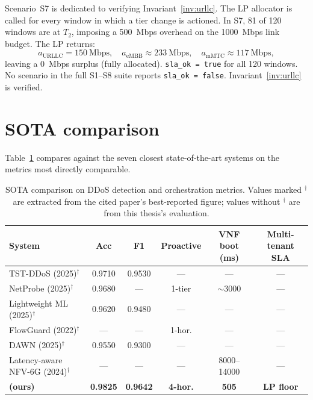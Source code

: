 Scenario~S7 is dedicated to verifying Invariant~\ref{inv:urllc}. The LP
allocator is called for every window in which a tier change is actioned.
In S7, 81 of 120 windows are at $T_2$, imposing a 500~Mbps overhead on
the 1000~Mbps link budget. The LP returns:
\[
  a_{\text{URLLC}} = 150~\text{Mbps},\quad
  a_{\text{eMBB}} \approx 233~\text{Mbps},\quad
  a_{\text{mMTC}} \approx 117~\text{Mbps},
\]
leaving a 0~Mbps surplus (fully allocated). \texttt{sla\_ok = true}
for all 120 windows. No scenario in the full S1--S8 suite reports
\texttt{sla\_ok = false}. Invariant~\ref{inv:urllc} is verified.

\section{SOTA comparison}
\label{sec:sota}

Table~\ref{tab:sota} compares \padonap{} against the seven closest
state-of-the-art systems on the metrics most directly comparable.

\begin{table}[H]
\centering
\footnotesize
\caption{SOTA comparison on DDoS detection and orchestration metrics.
Values marked $^\dagger$ are extracted from the cited paper's best-reported
figure; values without $^\dagger$ are from this thesis's evaluation.}
\label{tab:sota}
\begin{tabular}{@{}lccccc@{}}
\toprule
System & Acc & F1 & Proactive & VNF boot (ms) & Multi-tenant SLA \\
\midrule
TST-DDoS (2025)$^\dagger$            & 0.9710 & 0.9530 & ---    & ---    & --- \\
NetProbe (2025)$^\dagger$            & 0.9680 & ---    & 1-tier & $\sim$3000 & --- \\
Lightweight ML (2025)$^\dagger$      & 0.9620 & 0.9480 & ---    & ---    & --- \\
FlowGuard (2022)$^\dagger$           & ---    & ---    & 1-hor. & ---    & --- \\
DAWN (2025)$^\dagger$                & 0.9550 & 0.9300 & ---    & ---    & --- \\
Latency-aware NFV-6G (2024)$^\dagger$& ---    & ---    & ---    & 8000--14000 & --- \\
\textbf{\padonap{} (ours)}           & \textbf{0.9825} & \textbf{0.9642} & \textbf{4-hor.} & \textbf{505} & \textbf{LP floor} \\
\bottomrule
\end{tabular}
\end{table}

